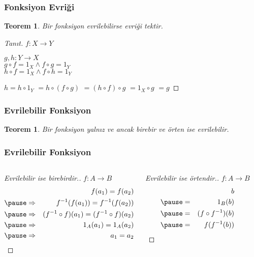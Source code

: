 \documentclass[dvipsnames]{beamer}
\theoremstyle{definition}
\theoremstyle{example}
\theoremstyle{plain}
\newtheorem{teorem}[theorem]{Teorem}
\begin{document}
\begin{frame}
  \frametitle{Fonksiyon Evriği}

  \begin{teorem}
    Bir fonksiyon evrilebilirse evriği tektir.
  \end{teorem}

  \pause
  \begin{proof}[Tanıt]
    $f: X \rightarrow Y$

    \pause
    \medskip
    $g,h: Y \rightarrow X$\\
    $g \circ f = 1_X \wedge f \circ g = 1_Y$\\
    $h \circ f = 1_X \wedge f \circ h = 1_Y$

    \pause
    \medskip
    $h = h \circ 1_Y$
    \pause
    $ = h \circ (f \circ g)$
    \pause
    $ = (h \circ f) \circ g$
    \pause
    $ = 1_X \circ g$
    \pause
    $ = g$
  \end{proof}
\end{frame}

\begin{frame}
  \frametitle{Evrilebilir Fonksiyon}

  \begin{teorem}
    Bir fonksiyon yalnız ve ancak birebir ve örten ise evrilebilir.
  \end{teorem}
\end{frame}

\begin{frame}
  \frametitle{Evrilebilir Fonksiyon}

  \begin{columns}[t]
    \begin{proof}[Evrilebilir ise birebirdir.]
      $f: A \rightarrow B$
      \begin{eqnarray*}
        &             & f(a_1) = f(a_2)\\\pause
        & \Rightarrow & f^{-1}(f(a_1)) = f^{-1}(f(a_2))\\\pause
        & \Rightarrow & (f^{-1} \circ f) (a_1) = (f^{-1} \circ f) (a_2)\\\pause
        & \Rightarrow & 1_A (a_1) = 1_A (a_2)\\\pause
        & \Rightarrow & a_1 = a_2
      \end{eqnarray*}
    \end{proof}

    \pause
    \begin{proof}[Evrilebilir ise örtendir.]
      $f: A \rightarrow B$
      \begin{eqnarray*}
        &   & b\\\pause
        & = & 1_B (b)\\\pause
        & = & (f \circ f^{-1}) (b)\\\pause
        & = & f(f^{-1} (b))
      \end{eqnarray*}
    \end{proof}
  \end{columns}
\end{frame}
\end{document}
